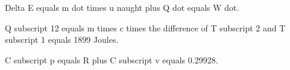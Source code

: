 Delta E equals m dot times u naught plus Q dot equals W dot.

Q subscript 12 equals m times c times the difference of T subscript 2 and T subscript 1 equals 1899 Joules.

C subscript p equals R plus C subscript v equals 0.29928.